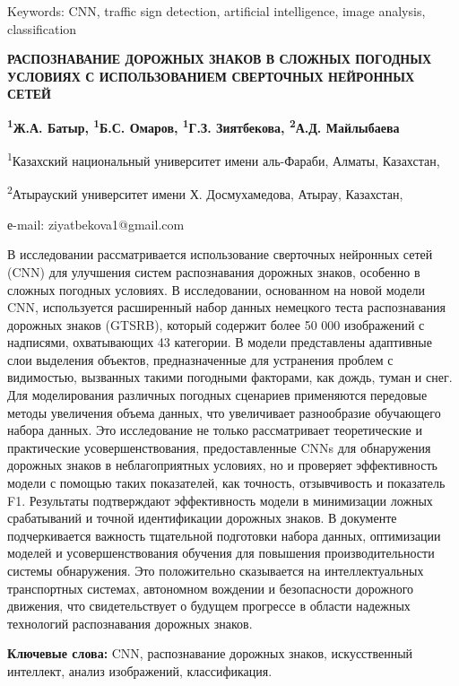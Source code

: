 Keywords: CNN, traffic sign detection, artificial intelligence, image
analysis, classification

\begin{center}
{\large\bfseries РАСПОЗНАВАНИЕ ДОРОЖНЫХ ЗНАКОВ В СЛОЖНЫХ ПОГОДНЫХ УСЛОВИЯХ С
ИСПОЛЬЗОВАНИЕМ СВЕРТОЧНЫХ НЕЙРОННЫХ СЕТЕЙ}

{\bfseries \textsuperscript{1}Ж.А. Батыр, \textsuperscript{1}Б.С. Омаров,
\textsuperscript{1}Г.З. Зиятбекова, \textsuperscript{2}А.Д. Майлыбаева}

\textsuperscript{1}Казахский национальный университет имени аль-Фараби,
Алматы, Казахстан,

\textsuperscript{2}Атырауский университет имени Х. Досмухамедова,
Атырау, Казахстан,

е-mail: ziyatbekova1@gmail.com
\end{center}

В исследовании рассматривается использование сверточных нейронных сетей
(CNN) для улучшения систем распознавания дорожных знаков, особенно в
сложных погодных условиях. В исследовании, основанном на новой модели
CNN, используется расширенный набор данных немецкого теста распознавания
дорожных знаков (GTSRB), который содержит более 50 000 изображений с
надписями, охватывающих 43 категории. В модели представлены адаптивные
слои выделения объектов, предназначенные для устранения проблем с
видимостью, вызванных такими погодными факторами, как дождь, туман и
снег. Для моделирования различных погодных сценариев применяются
передовые методы увеличения объема данных, что увеличивает разнообразие
обучающего набора данных. Это исследование не только рассматривает
теоретические и практические усовершенствования, предоставленные CNNs
для обнаружения дорожных знаков в неблагоприятных условиях, но и
проверяет эффективность модели с помощью таких показателей, как
точность, отзывчивость и показатель F1. Результаты подтверждают
эффективность модели в минимизации ложных срабатываний и точной
идентификации дорожных знаков. В документе подчеркивается важность
тщательной подготовки набора данных, оптимизации моделей и
усовершенствования обучения для повышения производительности системы
обнаружения. Это положительно сказывается на интеллектуальных
транспортных системах, автономном вождении и безопасности дорожного
движения, что свидетельствует о будущем прогрессе в области надежных
технологий распознавания дорожных знаков.

{\bfseries Ключевые слова:} CNN, распознавание дорожных знаков,
искусственный интеллект, анализ изображений, классификация.

